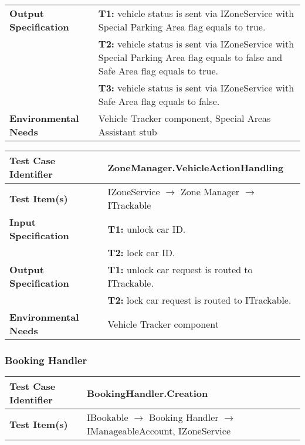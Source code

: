 {\begin{tabularx}{\textwidth}{l X}
    \textbf{Output Specification} & \textbf{T1:} vehicle status is sent via IZoneService with Special Parking Area flag equals to true.\\
                                & \textbf{T2:} vehicle status is sent via IZoneService with Special Parking Area flag equals to false and Safe Area flag equals to true.\\
                                & \textbf{T3:} vehicle status is sent via IZoneService with Safe Area flag equals to false.\\
    \hline 
    
    \textbf{Environmental Needs} & Vehicle Tracker component, Special Areas Assistant stub\\
    \hline
\end{tabularx}
\bigskip 


\noindent 
\begin{tabularx}{\textwidth}{l X}
    \hline 
    \textbf{Test Case Identifier} & ZoneManager.VehicleActionHandling\\ 
    \hline 
    
    \textbf{Test Item(s)} & IZoneService $\rightarrow$ Zone Manager $\rightarrow$ ITrackable\\
    \hline 
    
    \textbf{Input Specification} & \textbf{T1:} unlock car ID.\\
                                & \textbf{T2:} lock car ID.\\
    \hline 
    
    \textbf{Output Specification} & \textbf{T1:} unlock car request is routed to ITrackable. \\
                                & \textbf{T2:} lock car request is routed to ITrackable. \\
    \hline 
    
    \textbf{Environmental Needs} & Vehicle Tracker component\\
    \hline
\end{tabularx}

\subsubsection{Booking Handler}
\begin{tabularx}{\textwidth}{l X}
    \hline 
    \textbf{Test Case Identifier} & BookingHandler.Creation\\ 
    \hline 
    
    \textbf{Test Item(s)} & IBookable $\rightarrow$ Booking Handler $\rightarrow$ IManageableAccount, IZoneService\\
    \hline 
    

\end{tabularx}}

